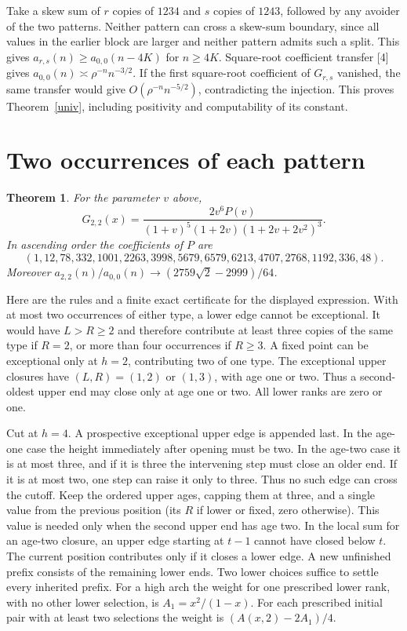 \documentclass[11pt,letterpaper]{article}
\newtheorem{theorem}{Theorem}
\begin{document}
Take a skew sum of $r$ copies of $1234$ and $s$ copies of $1243$, followed by any avoider of the two patterns. Neither pattern can cross a skew-sum boundary, since all values in the earlier block are larger and neither pattern admits such a split. This gives $a_{r,s}(n)\ge a_{0,0}(n-4K)$ for $n\ge4K$. Square-root coefficient transfer [4] gives $a_{0,0}(n)\asymp \rho^{-n}n^{-3/2}$. If the first square-root coefficient of $G_{r,s}$ vanished, the same transfer would give $O(\rho^{-n}n^{-5/2})$, contradicting the injection. This proves Theorem~\ref{univ}, including positivity and computability of its constant.

\section{Two occurrences of each pattern}
\begin{theorem}\label{exact}
For the parameter $v$ above,
\[
 G_{2,2}(x)=\frac{2v^6 P(v)}{(1+v)^5(1+2v)(1+2v+2v^2)^3}.
\]
In ascending order the coefficients of $P$ are
\[
 (1,12,78,332,1001,2263,3998,5679,6579,6213,4707,2768,1192,336,48).
\]
Moreover $a_{2,2}(n)/a_{0,0}(n)\longrightarrow(2759\sqrt2-2999)/64$.
\end{theorem}
Here are the rules and a finite exact certificate for the displayed expression. With at most two occurrences of either type, a lower edge cannot be exceptional. It would have $L>R\ge2$ and therefore contribute at least three copies of the same type if $R=2$, or more than four occurrences if $R\ge3$. A fixed point can be exceptional only at $h=2$, contributing two of one type. The exceptional upper closures have $(L,R)=(1,2)$ or $(1,3)$, with age one or two. Thus a second-oldest upper end may close only at age one or two. All lower ranks are zero or one.

Cut at $h=4$. A prospective exceptional upper edge is appended last. In the age-one case the height immediately after opening must be two. In the age-two case it is at most three, and if it is three the intervening step must close an older end. If it is at most two, one step can raise it only to three. Thus no such edge can cross the cutoff. Keep the ordered upper ages, capping them at three, and a single value from the previous position (its $R$ if lower or fixed, zero otherwise). This value is needed only when the second upper end has age two. In the local sum for an age-two closure, an upper edge starting at $t-1$ cannot have closed below $t$. The current position contributes only if it closes a lower edge. A new unfinished prefix consists of the remaining lower ends. Two lower choices suffice to settle every inherited prefix. For a high arch the weight for one prescribed lower rank, with no other lower selection, is $A_1=x^2/(1-x)$. For each prescribed initial pair with at least two selections the weight is $(A(x,2)-2A_1)/4$.
\end{document}
